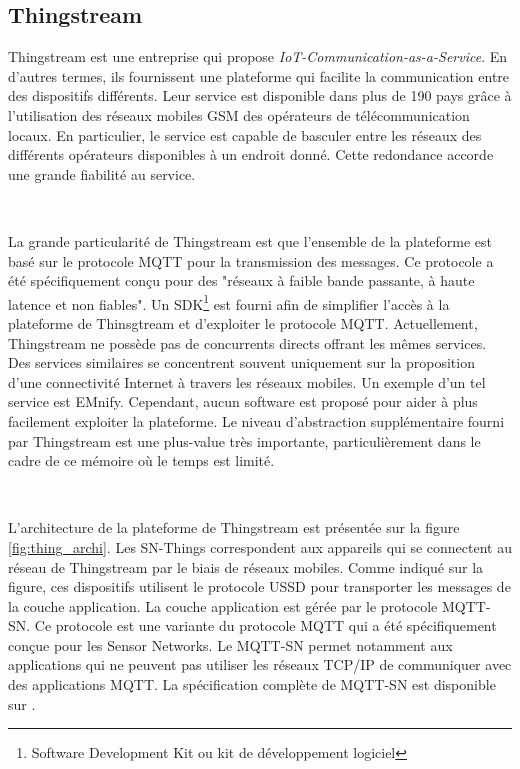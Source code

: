 \subsection{Thingstream}
\label{sec:thingstream}

\noindent
Thingstream est une entreprise qui propose \textit{IoT-Communication-as-a-Service}. En d'autres termes, ils fournissent une plateforme qui facilite la communication entre des dispositifs différents. Leur service est disponible dans plus de 190 pays grâce à l'utilisation des réseaux mobiles GSM des opérateurs de télécommunication locaux. En particulier, le service est capable de basculer entre les réseaux des différents opérateurs disponibles à un endroit donné. Cette redondance accorde une grande fiabilité au service.

~

\noindent
La grande particularité de Thingstream est que l'ensemble de la plateforme est basé sur le protocole MQTT pour la transmission des messages. Ce protocole a été spécifiquement conçu pour des "réseaux à faible bande passante, à haute latence et non fiables"\cite{mqtt_faq}. Un SDK\footnote{Software Development Kit ou kit de développement logiciel} est fourni afin de simplifier l'accès à la plateforme de Thinsgtream et d'exploiter le protocole MQTT. Actuellement, Thingstream ne possède pas de concurrents directs offrant les mêmes services. Des services similaires se concentrent souvent uniquement sur la proposition d'une connectivité Internet à travers les réseaux mobiles. Un exemple d'un tel service est EMnify. Cependant, aucun software est proposé pour aider à plus facilement exploiter la plateforme. Le niveau d'abstraction supplémentaire fourni par Thingstream est une plus-value très importante, particulièrement dans le cadre de ce mémoire où le temps est limité.

~

\noindent
L'architecture de la plateforme de Thingstream est présentée sur la figure \ref{fig:thing_archi}. Les SN-Things correspondent aux appareils qui se connectent au réseau de Thingstream par le biais de réseaux mobiles. Comme indiqué sur la figure, ces dispositifs utilisent le protocole USSD pour transporter les messages de la couche application. La couche application est gérée par le protocole MQTT-SN. Ce protocole est une variante du protocole MQTT qui a été spécifiquement conçue pour les Sensor Networks. Le MQTT-SN permet notamment aux applications qui ne peuvent pas utiliser les réseaux TCP/IP de communiquer avec des applications MQTT. La spécification complète de MQTT-SN est disponible sur \cite{stanford2013mqtt}.


